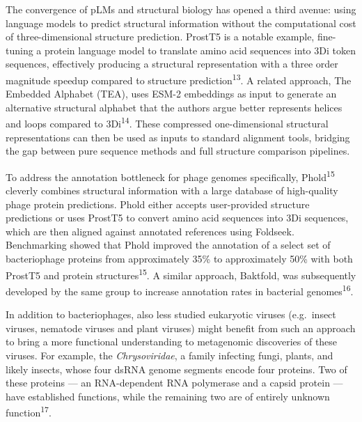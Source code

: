 \documentclass[
  sn-nature,
]{sn-jnl}
\begin{document}
The convergence of pLMs and structural biology has opened a third
avenue: using language models to predict structural information without
the computational cost of three-dimensional structure prediction.
ProstT5 is a notable example, fine-tuning a protein language model to
translate amino acid sequences into 3Di token sequences, effectively
producing a structural representation with a three order magnitude
speedup compared to structure prediction\textsuperscript{13}. A related
approach, The Embedded Alphabet (TEA), uses ESM-2 embeddings as input to
generate an alternative structural alphabet that the authors argue
better represents helices and loops compared to 3Di\textsuperscript{14}.
These compressed one-dimensional structural representations can then be
used as inputs to standard alignment tools, bridging the gap between
pure sequence methods and full structure comparison pipelines.

To address the annotation bottleneck for phage genomes specifically,
Phold\textsuperscript{15} cleverly combines structural information with
a large database of high-quality phage protein predictions. Phold either
accepts user-provided structure predictions or uses ProstT5 to convert
amino acid sequences into 3Di sequences, which are then aligned against
annotated references using Foldseek. Benchmarking showed that Phold
improved the annotation of a select set of bacteriophage proteins from
approximately 35\% to approximately 50\% with both ProstT5 and protein
structures\textsuperscript{15}. A similar approach, Baktfold, was
subsequently developed by the same group to increase annotation rates in
bacterial genomes\textsuperscript{16}.

In addition to bacteriophages, also less studied eukaryotic viruses
(e.g.~insect viruses, nematode viruses and plant viruses) might benefit
from such an approach to bring a more functional understanding to
metagenomic discoveries of these viruses. For example, the
\emph{Chrysoviridae}, a family infecting fungi, plants, and likely
insects, whose four dsRNA genome segments encode four proteins. Two of
these proteins --- an RNA-dependent RNA polymerase and a capsid protein
--- have established functions, while the remaining two are of entirely
unknown function\textsuperscript{17}.
\end{document}
